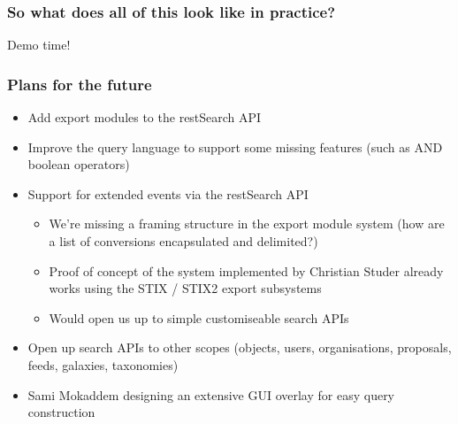\begin{frame}
\frametitle{So what does all of this look like in practice?}
        \begin{center}
        	\item Demo time!
        \end{center}
\end{frame}

\begin{frame}
\frametitle{Plans for the future}
    \begin{itemize}
	\item Add export modules to the restSearch API
        \item Improve the query language to support some missing features (such as AND boolean operators)
        \item Support for extended events via the restSearch API
	\begin{itemize}
	    \item We're missing a framing structure in the export module system (how are a list of conversions encapsulated and delimited?)
            \item Proof of concept of the system implemented by Christian Studer already works using the STIX / STIX2 export subsystems
	    \item Would open us up to simple customiseable search APIs
	\end{itemize}
	\item Open up search APIs to other scopes (objects, users, organisations, proposals, feeds, galaxies, taxonomies)
	\item Sami Mokaddem designing an extensive GUI overlay for easy query construction
    \end{itemize}
\end{frame}


